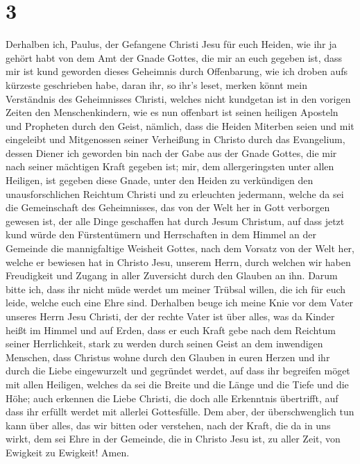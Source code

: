 \hypertarget{section-2}{%
\section{3}\label{section-2}}

 Derhalben ich, Paulus, der Gefangene Christi Jesu für
euch Heiden,  wie ihr ja gehört habt von dem Amt der Gnade
Gottes, die mir an euch gegeben ist,  dass mir ist kund
geworden dieses Geheimnis durch Offenbarung, wie ich droben aufs
kürzeste geschrieben habe,  daran ihr, so ihr's leset,
merken könnt mein Verständnis des Geheimnisses Christi, 
welches nicht kundgetan ist in den vorigen Zeiten den Menschenkindern,
wie es nun offenbart ist seinen heiligen Aposteln und Propheten durch
den Geist,  nämlich, dass die Heiden Miterben seien und
mit eingeleibt und Mitgenossen seiner Verheißung in Christo durch das
Evangelium,  dessen Diener ich geworden bin nach der Gabe
aus der Gnade Gottes, die mir nach seiner mächtigen Kraft gegeben ist;
 mir, dem allergeringsten unter allen Heiligen, ist
gegeben diese Gnade, unter den Heiden zu verkündigen den
unausforschlichen Reichtum Christi  und zu erleuchten
jedermann, welche da sei die Gemeinschaft des Geheimnisses, das von der
Welt her in Gott verborgen gewesen ist, der alle Dinge geschaffen hat
durch Jesum Christum,  auf dass jetzt kund würde den
Fürstentümern und Herrschaften in dem Himmel an der Gemeinde die
mannigfaltige Weisheit Gottes,  nach dem Vorsatz von der
Welt her, welche er bewiesen hat in Christo Jesu, unserem Herrn,
 durch welchen wir haben Freudigkeit und Zugang in aller
Zuversicht durch den Glauben an ihn.  Darum bitte ich,
dass ihr nicht müde werdet um meiner Trübsal willen, die ich für euch
leide, welche euch eine Ehre sind.  Derhalben beuge ich
meine Knie vor dem Vater unseres Herrn Jesu Christi,  der
der rechte Vater ist über alles, was da Kinder heißt im Himmel und auf
Erden,  dass er euch Kraft gebe nach dem Reichtum seiner
Herrlichkeit, stark zu werden durch seinen Geist an dem inwendigen
Menschen,  dass Christus wohne durch den Glauben in euren
Herzen und ihr durch die Liebe eingewurzelt und gegründet werdet,
 auf dass ihr begreifen möget mit allen Heiligen, welches
da sei die Breite und die Länge und die Tiefe und die Höhe;
 auch erkennen die Liebe Christi, die doch alle
Erkenntnis übertrifft, auf dass ihr erfüllt werdet mit allerlei
Gottesfülle.  Dem aber, der überschwenglich tun kann über
alles, das wir bitten oder verstehen, nach der Kraft, die da in uns
wirkt,  dem sei Ehre in der Gemeinde, die in Christo Jesu
ist, zu aller Zeit, von Ewigkeit zu Ewigkeit! Amen.

